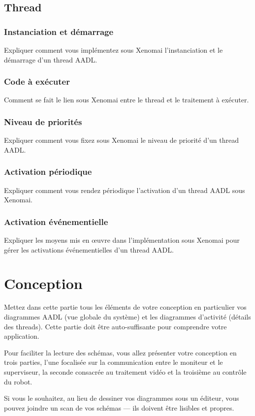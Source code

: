 \documentclass[11pt, a4paper]{paper}
\begin{document}
\subsection{Thread}
\subsubsection{Instanciation et démarrage}
 {\color{blue} Expliquer comment vous implémentez sous Xenomai l'instanciation et le démarrage d'un  thread AADL.}

\subsubsection{Code à exécuter}
 {\color{blue} Comment se fait le lien sous Xenomai entre le thread et le traitement à exécuter.}

\subsubsection{Niveau de priorités}
 {\color{blue} Expliquer comment vous fixez sous Xenomai le niveau de priorité d'un thread AADL.}

\subsubsection{Activation périodique}
 {\color{blue} Expliquer comment vous rendez périodique l'activation d'un thread AADL sous Xenomai.}

\subsubsection{Activation événementielle}
 {\color{blue} Expliquer les moyens mis en {\oe}uvre dans l'implémentation sous Xenomai pour gérer les activations événementielles d'un thread AADL.}





\section{Conception}

{\color{red} Mettez dans cette partie tous les éléments de votre conception en particulier vos diagrammes AADL (vue globale du système) et les diagrammes d'activité (détails des threads). Cette partie doit être auto-suffisante pour comprendre votre application.

Pour faciliter la lecture des schémas, vous allez présenter votre conception en trois parties, l'une focalisée sur la communication entre le moniteur et le superviseur, la seconde consacrée au traitement vidéo et la troisième au contrôle du robot.

Si vous le souhaitez, au lieu de dessiner vos diagrammes sous un éditeur, vous pouvez joindre un scan de vos schémas — ils doivent être lisibles et propres.}
\end{document}
